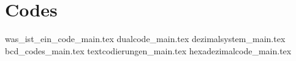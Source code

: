 \part{Codes}

{was_ist_ein_code_main.tex}
{dualcode_main.tex}
{dezimalsystem_main.tex}
{bcd_codes_main.tex}
{textcodierungen_main.tex}
{hexadezimalcode_main.tex}
